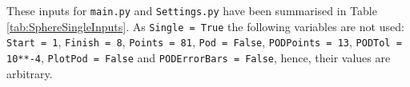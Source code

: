 \noindent
These inputs for \texttt{main.py} and \texttt{Settings.py} have been summarised in Table \ref{tab:SphereSingleInputs}. As  \texttt{Single = True} the following variables are not used: \texttt{Start = 1}, \texttt{Finish = 8}, \texttt{Points = 81}, \texttt{Pod = False}, \texttt{PODPoints = 13}, \texttt{PODTol = 10**-4}, \texttt{PlotPod = False} and \texttt{PODErrorBars = False}, hence, their values are arbitrary. 
